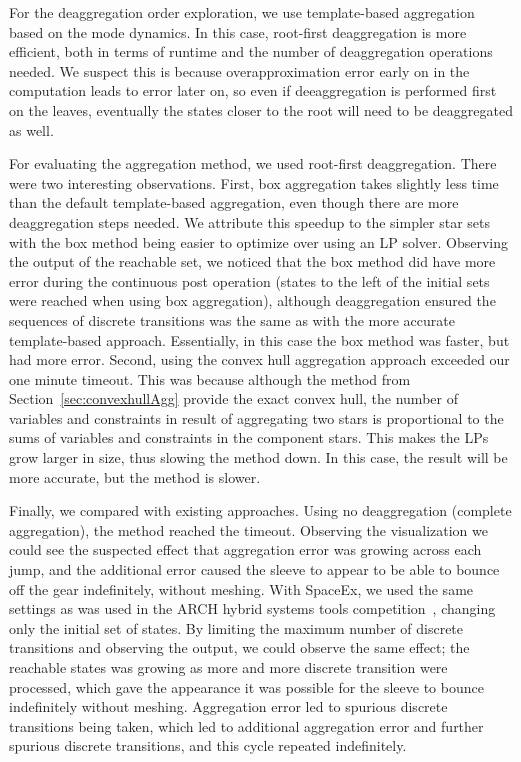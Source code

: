 For the deaggregation order exploration, we use template-based aggregation based on the mode dynamics.
%
In this case, root-first deaggregation is more efficient, both in terms of runtime and the number of deaggregation operations needed.
%
We suspect this is because overapproximation error early on in the computation leads to error later on, so even if deeaggregation is performed first on the leaves,
eventually the states closer to the root will need to be deaggregated as well.

For evaluating the aggregation method, we used root-first deaggregation.
%
There were two interesting observations.
%
First, box aggregation takes slightly less time than the default template-based aggregation, even though there are more deaggregation steps needed.
%
We attribute this speedup to the simpler star sets with the box method being easier to optimize over using an LP solver.
%
Observing the output of the reachable set, we noticed that the box method did have more error during the continuous post operation
(states to the left of the initial sets were reached when using box aggregation),
although deaggregation ensured the sequences of discrete transitions
was the same as with the more accurate template-based approach.
%
Essentially, in this case the box method was faster, but had more error.
%
Second, using the convex hull aggregation approach exceeded our one minute timeout.
%
This was because although the method from Section~\ref{sec:convexhullAgg} provide the exact convex hull, the number of variables and constraints
in result of aggregating two stars is proportional to the sums of variables and constraints in the component stars.
%
This makes the LPs grow larger in size, thus slowing the method down.
%
In this case, the result will be more accurate, but the method is slower.

Finally, we compared with existing approaches.
%
Using no deaggregation (complete aggregation), the method reached the timeout.
%
Observing the visualization we could see the suspected effect that aggregation error was growing across each jump, and
the additional error caused the sleeve to appear to be able to bounce off the gear indefinitely, without meshing.
%
With SpaceEx, we used the same settings as was used in the ARCH hybrid systems tools competition~\cite{archcomp19},
changing only the initial set of states.
%
By limiting the maximum number of discrete transitions and observing the output,
we could observe the same effect; the reachable states was growing as more and more discrete transition were processed, which
gave the appearance it was possible for the sleeve to bounce indefinitely without meshing.
%
Aggregation error led to spurious discrete transitions being taken, which led to additional aggregation error and further
spurious discrete transitions, and this cycle repeated indefinitely.
\vspace{-0.1cm}

%
